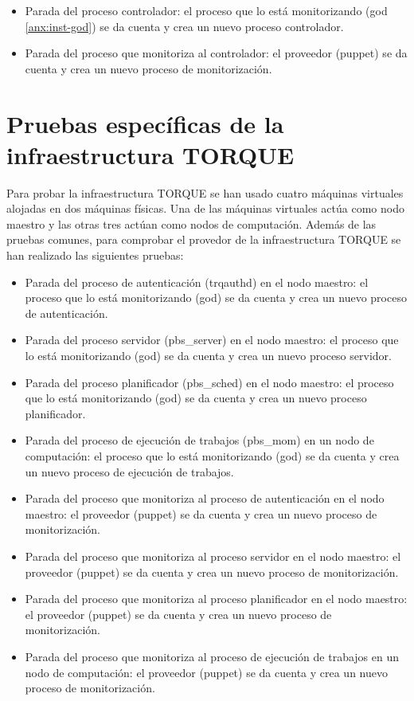 \begin{itemize}
\item Parada del proceso controlador: el proceso que lo está monitorizando (god \ref{anx:inst-god}) se da cuenta y crea un nuevo proceso controlador.
\item Parada del proceso que monitoriza al controlador: el proveedor (puppet) se da cuenta y crea un nuevo proceso de monitorización.
\end{itemize}


\section{Pruebas específicas de la infraestructura TORQUE}

Para probar la infraestructura TORQUE se han usado cuatro máquinas virtuales alojadas en dos máquinas físicas. Una de las máquinas virtuales actúa como nodo maestro y las otras tres actúan como nodos de computación. Además de las pruebas comunes, para comprobar el provedor de la infraestructura TORQUE se han realizado las siguientes pruebas:

\begin{itemize}
\item Parada del proceso de autenticación (trqauthd) en el nodo maestro: el proceso que lo está monitorizando (god) se da cuenta y crea un nuevo proceso de autenticación.
\item Parada del proceso servidor (pbs\_server) en el nodo maestro: el proceso que lo está monitorizando (god) se da cuenta y crea un nuevo proceso servidor.
\item Parada del proceso planificador (pbs\_sched) en el nodo maestro: el proceso que lo está monitorizando (god) se da cuenta y crea un nuevo proceso planificador.
\item Parada del proceso de ejecución de trabajos (pbs\_mom) en un nodo de computación: el proceso que lo está monitorizando (god) se da cuenta y crea un nuevo proceso de ejecución de trabajos.
\item Parada del proceso que monitoriza al proceso de autenticación en el nodo maestro: el proveedor (puppet) se da cuenta y crea un nuevo proceso de monitorización.
\item Parada del proceso que monitoriza al proceso servidor en el nodo maestro: el proveedor (puppet) se da cuenta y crea un nuevo proceso de monitorización.
\item Parada del proceso que monitoriza al proceso planificador en el nodo maestro: el proveedor (puppet) se da cuenta y crea un nuevo proceso de monitorización.
\item Parada del proceso que monitoriza al proceso de ejecución de trabajos en un nodo de computación: el proveedor (puppet) se da cuenta y crea un nuevo proceso de monitorización.
\end{itemize}



